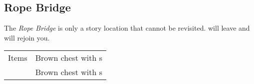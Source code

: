 \subsection{Rope Bridge}
\label{map:rope_bridge}

The \textit{Rope Bridge} is only a story location that cannot be revisited.  will leave and  will rejoin you.

\noindent\begin{tabularx}{\textwidth}[l]{lX}
	Items
	& Brown chest with \nameref{item:cure_potion}s \\
	& Brown chest with \nameref{item:seed}s
\end{tabularx}
